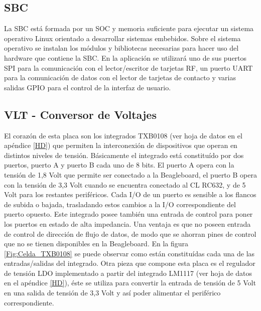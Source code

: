 \subsection{SBC}
La SBC está formada por un SOC y memoria suficiente para ejecutar un sistema operativo Linux orientado a desarrollar sistemas embebidos. Sobre el sistema operativo se instalan los módulos y bibliotecas necesarias para hacer uso del hardware que contiene la SBC. En la aplicación se utilizará uno de sus puertos SPI para la comunicación con el lector/escritor de tarjetas RF, un puerto UART para la comunicación de datos con el lector de tarjetas de contacto y varias salidas GPIO para el control de la interfaz de usuario.

\subsection{VLT - Conversor de Voltajes}
El corazón de esta placa son los integrados TXB0108 \cite{HD_VLT} (ver hoja de datos en el apéndice \ref{HD}) que permiten la interconexión de dispositivos que operan en distintos niveles de tensión. Básicamente el integrado está constituído por dos puertos, puerto A y puerto B cada uno de 8 bits. El puerto A opera con la tensión de 1,8 Volt que permite ser conectado a la Beagleboard, el puerto B opera con la tensión de 3,3 Volt cuando se encuentra conectado al CL RC632, y de 5 Volt para los restantes periféricos.
Cada I/O de un puerto es sensible a los flancos de subida o bajada, trasladando estos cambios a la I/O correspondiente del puerto opuesto. 
Este integrado posee también una entrada de control para poner los puertos en estado de alta impedancia.
Una ventaja es que no poseen entrada de control de dirección de flujo de datos, de modo que se ahorran pines de control que no se tienen disponibles en la Beagleboard.
En la figura \ref{Fig:Celda_TXB0108} se puede observar como están constituídas cada una de las entradas/salidas del integrado.
Otra pieza que compone esta placa es el regulador de tensión LDO implementado a partir del integrado LM1117 \cite{LDO} (ver hoja de datos en el apéndice \ref{HD}), éste se utiliza para convertir la entrada de tensión de 5 Volt en una salida de tensión de 3,3 Volt y así poder alimentar el periférico correspondiente.


